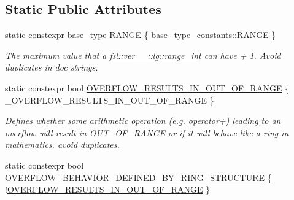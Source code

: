 \subsection*{Static Public Attributes}
\begin{DoxyCompactItemize}
\item 
static constexpr \mbox{\hyperlink{classfsl_1_1ver__1__0_1_1lg_1_1range__int_aa6c763f6d72d18c8b9129c0c06628cd3}{base\+\_\+type}} \mbox{\hyperlink{classfsl_1_1ver__1__0_1_1lg_1_1range__int_ae1914aaa2b3bdfc26a9dfd71c73efffd}{R\+A\+N\+GE}} \{ base\+\_\+type\+\_\+constants\+::\+R\+A\+N\+GE \}
\begin{DoxyCompactList}\small\item\em The maximum value that a \mbox{\hyperlink{classfsl_1_1ver__1__0_1_1lg_1_1range__int}{fsl\+::ver\+\_\+\_\+::lg\+::range\+\_\+int}} can have + 1. Avoid duplicates in doc strings. \end{DoxyCompactList}\item 
\mbox{\label{classfsl_1_1ver__1__0_1_1lg_1_1range__int_ab02a06984504bfb393852d6b89f8fabd}} 
static constexpr bool \mbox{\hyperlink{classfsl_1_1ver__1__0_1_1lg_1_1range__int_ab02a06984504bfb393852d6b89f8fabd}{O\+V\+E\+R\+F\+L\+O\+W\+\_\+\+R\+E\+S\+U\+L\+T\+S\+\_\+\+I\+N\+\_\+\+O\+U\+T\+\_\+\+O\+F\+\_\+\+R\+A\+N\+GE}} \{ \+\_\+\+O\+V\+E\+R\+F\+L\+O\+W\+\_\+\+R\+E\+S\+U\+L\+T\+S\+\_\+\+I\+N\+\_\+\+O\+U\+T\+\_\+\+O\+F\+\_\+\+R\+A\+N\+GE \}
\begin{DoxyCompactList}\small\item\em Defines whether some arithmetic operation (e.\+g. \mbox{\hyperlink{classfsl_1_1ver__1__0_1_1lg_1_1range__int_a6ca845f4b8e8805cba8037d1fd9c4200}{operator+}}) leading to an overflow will result in \mbox{\hyperlink{classfsl_1_1ver__1__0_1_1lg_1_1range__int_a4262605b56b8b319c33b0d1ccb190a82}{O\+U\+T\+\_\+\+O\+F\+\_\+\+R\+A\+N\+GE}} or if it will behave like a ring in mathematics. avoid duplicates. \end{DoxyCompactList}\item 
\mbox{\label{classfsl_1_1ver__1__0_1_1lg_1_1range__int_a41b424801970c9b9826d913504a7ff21}} 
static constexpr bool \mbox{\hyperlink{classfsl_1_1ver__1__0_1_1lg_1_1range__int_a41b424801970c9b9826d913504a7ff21}{O\+V\+E\+R\+F\+L\+O\+W\+\_\+\+B\+E\+H\+A\+V\+I\+O\+R\+\_\+\+D\+E\+F\+I\+N\+E\+D\+\_\+\+B\+Y\+\_\+\+R\+I\+N\+G\+\_\+\+S\+T\+R\+U\+C\+T\+U\+RE}} \{ !\mbox{\hyperlink{classfsl_1_1ver__1__0_1_1lg_1_1range__int_ab02a06984504bfb393852d6b89f8fabd}{O\+V\+E\+R\+F\+L\+O\+W\+\_\+\+R\+E\+S\+U\+L\+T\+S\+\_\+\+I\+N\+\_\+\+O\+U\+T\+\_\+\+O\+F\+\_\+\+R\+A\+N\+GE}} \}

\end{DoxyCompactItemize}
